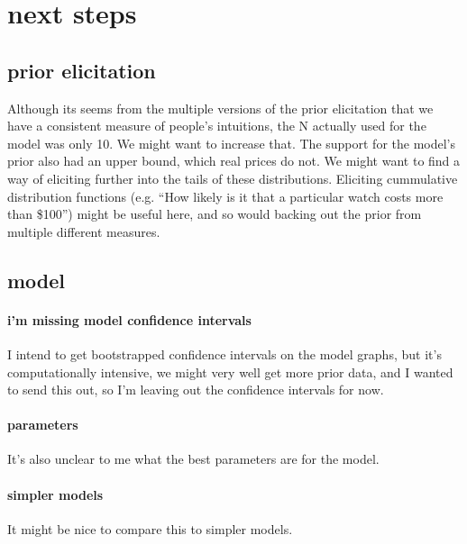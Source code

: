 \documentclass[10pt]{article}
\begin{document}
\section{next steps}
  \subsection{prior elicitation}
    Although its seems from the multiple versions of the prior elicitation that we have a consistent measure of people's intuitions, the N actually used for the model was only 10. We might want to increase that. The support for the model's prior also had an upper bound, which real prices do not. We might want to find a way of eliciting further into the tails of these distributions. Eliciting cummulative distribution functions (e.g. ``How likely is it that a particular watch costs more than \$100'') might be useful here, and so would backing out the prior from multiple different measures.
  
  \subsection{model}
    \paragraph{i'm missing model confidence intervals} I intend to get bootstrapped confidence intervals on the model graphs, but it's computationally intensive, we might very well get more prior data, and I wanted to send this out, so I'm leaving out the confidence intervals for now.
    
    \paragraph{parameters} It's also unclear to me what the best parameters are for the model.
    
    \paragraph{simpler models} It might be nice to compare this to simpler models.
\end{document}
